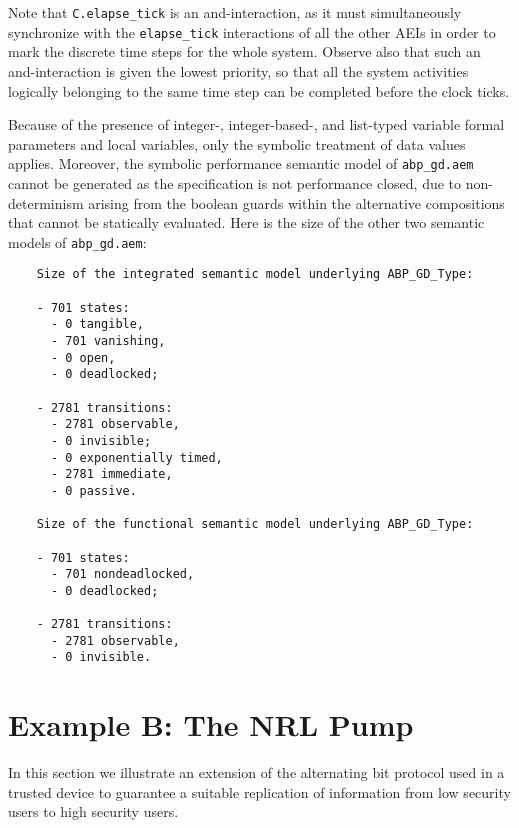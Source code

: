 \noindent Note that {\tt C.elapse\_tick} is an and-interaction, as it must simultaneously synchronize with
the {\tt elapse\_tick} interactions of all the other AEIs in order to mark the discrete time steps for the
whole system. Observe also that such an and-interaction is given the lowest priority, so that all the system
activities logically belonging to the same time step can be completed before the clock ticks.

Because of the presence of integer-, integer-based-, and list-typed variable formal parameters and local
variables, only the symbolic treatment of data values applies. Moreover, the symbolic performance semantic
model of {\tt abp\_gd.aem} cannot be generated as the specification is not performance closed, due to
non-determinism arising from the boolean guards within the alternative compositions that cannot be
statically evaluated. Here is the size of the other two semantic models of {\tt abp\_gd.aem}:

	\begin{verbatim}
    Size of the integrated semantic model underlying ABP_GD_Type:

    - 701 states: 
      - 0 tangible, 
      - 701 vanishing, 
      - 0 open, 
      - 0 deadlocked;

    - 2781 transitions:
      - 2781 observable,
      - 0 invisible;
      - 0 exponentially timed,
      - 2781 immediate,
      - 0 passive.

    Size of the functional semantic model underlying ABP_GD_Type:

    - 701 states: 
      - 701 nondeadlocked, 
      - 0 deadlocked;

    - 2781 transitions:
      - 2781 observable,
      - 0 invisible.
	\end{verbatim}



\section{Example B: The NRL Pump}

In this section we illustrate an extension of the alternating bit protocol used in a trusted device to
guarantee a suitable replication of information from low security users to high security users.



